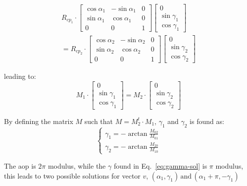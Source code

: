 \begin{equation}
\begin{split}
  R_{cp_{1}}\cdot
  \begin{bmatrix}
\cos\alpha_{1} & -\sin\alpha_{1} & 0\\
\sin\alpha_{1} & \cos\alpha_{1} & 0\\
0 & 0 & 1
\end{bmatrix}
\begin{bmatrix}
0\\
\sin\gamma_{1}\\
\cos\gamma_{1}
\end{bmatrix}
\\
=R_{cp_{2}}\cdot
\begin{bmatrix}
\cos\alpha_{2} & -\sin\alpha_{2} & 0\\
\sin\alpha_{2} & \cos\alpha_{2} & 0\\
0 & 0 & 1
\end{bmatrix}
\begin{bmatrix}
0\\
\sin\gamma_{2}\\
\cos\gamma_{2}
\end{bmatrix}
\end{split}
\end{equation}

leading to:
\begin{equation}
  M_{1}\cdot
  \begin{bmatrix}
0\\
\sin\gamma_{1}\\
\cos\gamma_{1}
\end{bmatrix}
=M_{2}\cdot
\begin{bmatrix}
0\\
\sin\gamma_{2}\\
\cos\gamma_{2}
\end{bmatrix}
\label{eq:2pts}
\end{equation}

\noindent By defining the matrix $M$ such
that $M=M_{2}^{t}\cdot M_{1}$, $\gamma_1$ and $\gamma_2$ is found as:
\begin{equation}
\begin{cases}
\gamma_{1}=-\arctan\frac{M_{02}}{M_{01}}\\
\gamma_{2}=-\arctan\frac{M_{20}}{M_{10}}
\end{cases}\label{eq:gamma-sol}
\end{equation}

The \gls{aop} is $2\pi$ modulus, while the $\gamma$ found in
Eq.~\ref{eq:gamma-sol} is $\pi$ modulus, this leads to two possible solutions
for vector $v$,
$\left(\alpha_{1},\gamma_{1}\right)\,\text{and}\,\left(\alpha_{1}+\pi,-\gamma_{1}\right)$

